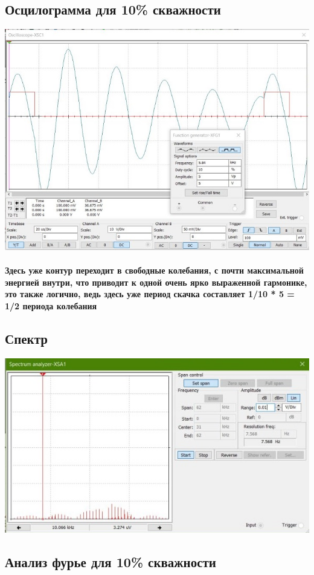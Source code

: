 \documentclass[12pt,a4paper]{article}
\begin{document}
	\subsection*{Осцилограмма для 10\% скважности}
	
	\includegraphics[width=0.7\linewidth]{src/oscil_1}
	
	
	\paragraph*{Здесь уже контур переходит в свободные колебания, с почти максимальной энергией внутри, что приводит к одной очень ярко выраженной гармонике, это также логично, ведь здесь уже период скачка составляет 1/10 * 5 = 1/2 периода колебания}
		
	\subsection*{Спектр}
	
	\includegraphics[width=0.7\linewidth]{src/spectr_1}
	
	\newpage
	
	\subsection*{Анализ фурье для 10\% скважности}
	
\end{document}
